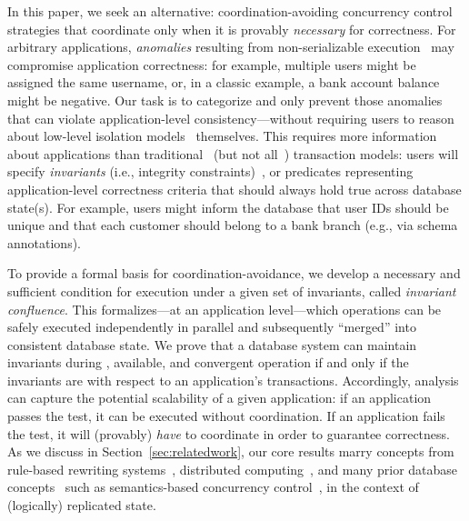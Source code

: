 
In this paper, we seek an alternative: coordination-avoiding
concurrency control strategies that coordinate only when it is
provably \textit{necessary} for correctness. For arbitrary
applications, \textit{anomalies} resulting from non-serializable
execution~\cite{adya-isolation} may compromise application
correctness: for example, multiple users might be assigned the same
username, or, in a classic example, a bank account balance might be
negative. Our task is to categorize and only prevent those anomalies
that can violate application-level consistency---without requiring
users to reason about low-level isolation models~\cite{hat-vldb}
themselves. This requires more information about applications than
traditional~\cite{bernstein-book,gray-virtues} (but not
all~\cite{eswaran-consistency,korth-serializability,decomp-semantics,garciamolina-semantics,activedb-book,ic-survey,ic-survey-two})
transaction models: users will specify \textit{invariants} (i.e.,
integrity constraints)~\cite{traiger-tods}, or predicates representing
application-level correctness criteria that should always hold true
across database state(s). For example, users might inform the database
that user IDs should be unique and that each customer should belong to
a bank branch (e.g., via schema annotations).

To provide a formal basis for coordination-avoidance, we develop a
necessary and sufficient condition for \cfree execution under a given
set of invariants, called \textit{invariant confluence}. This
\iconfluence formalizes---at an application level---which operations
can be safely executed independently in parallel and subsequently
``merged'' into consistent database state. We prove that a database
system can maintain invariants during \cfree, available, and
convergent operation if and only if the invariants are \iconfluent
with respect to an application's transactions. Accordingly,
\iconfluence analysis can capture the potential scalability of a given
application: if an application passes the \iconfluence test, it can be
executed without coordination. If an application fails the test, it
will (provably) \textit{have} to coordinate in order to guarantee
correctness. As we discuss in Section~\ref{sec:relatedwork}, our core
results marry concepts from rule-based rewriting
systems~\cite{obs-confluence,termrewriting}, distributed
computing~\cite{herlihy-apologizing,gilbert-cap,hat-vldb}, and many
prior database concepts~\cite{activedb-book,ic-survey,ic-survey-two}
such as semantics-based concurrency
control~\cite{sdd1,decomp-semantics,badrinath-semantics,garciamolina-semantics,korth-serializability,atomictransactions,weihl-thesis},
in the context of (logically) replicated state.


